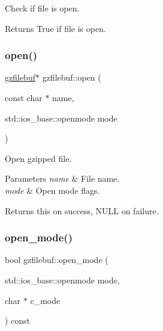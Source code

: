 Check if file is open. 

\begin{DoxyReturn}{Returns}
True if file is open. 
\end{DoxyReturn}
\mbox{\label{classgzfilebuf_a78281ba60675bf8727e92ed23b4a2cc9}} 
\subsubsection{\texorpdfstring{open()}{open()}}
{\footnotesize\ttfamily \hyperlink{classgzfilebuf}{gzfilebuf}$\ast$ gzfilebuf\+::open (\begin{DoxyParamCaption}\item[{const char $\ast$}]{name,  }\item[{std\+::ios\+\_\+base\+::openmode}]{mode }\end{DoxyParamCaption})}



Open gzipped file. 


\begin{DoxyParams}{Parameters}
{\em name} & File name. \\
\hline
{\em mode} & Open mode flags. \\
\hline
\end{DoxyParams}
\begin{DoxyReturn}{Returns}
{\ttfamily this} on success, N\+U\+LL on failure. 
\end{DoxyReturn}
\mbox{\label{classgzfilebuf_ab0c2c304183e591706681af26add3da2}} 
\subsubsection{\texorpdfstring{open\+\_\+mode()}{open\_mode()}}
{\footnotesize\ttfamily bool gzfilebuf\+::open\+\_\+mode (\begin{DoxyParamCaption}\item[{std\+::ios\+\_\+base\+::openmode}]{mode,  }\item[{char $\ast$}]{c\+\_\+mode }\end{DoxyParamCaption}) const\hspace{0.3cm}{\ttfamily [protected]}}



